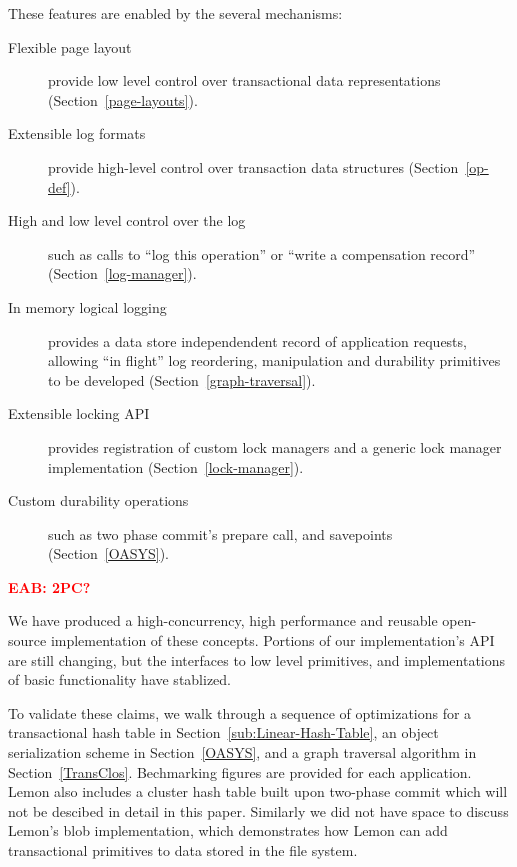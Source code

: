 \documentclass[letterpaper,twocolumn,english]{article}
\newcommand{\yad}{Lemon\xspace}
\newcommand{\eab}[1]{\textcolor{red}{\bf EAB: #1}}
\begin{document}
These features are enabled by the several mechanisms:
\begin{description}
\item[Flexible page layout] provide low level control over 
      transactional data representations (Section~\ref{page-layouts}).
\item[Extensible log formats] provide high-level control over
      transaction data structures (Section~\ref{op-def}).
\item [High and low level control over the log] such as calls to ``log this
      operation'' or ``write a compensation record'' (Section~\ref{log-manager}).
\item [In memory logical logging] provides a data store independendent
      record of application requests, allowing ``in flight'' log
      reordering, manipulation and durability primitives to be
      developed (Section~\ref{graph-traversal}).
\item[Extensible locking API] provides registration of custom lock managers
      and a generic lock manager implementation (Section~\ref{lock-manager}).
\item[Custom durability operations] such as two phase commit's
      prepare call, and savepoints (Section~\ref{OASYS}).
\item[\eab{2PC?}]
\end{description}

We have produced a high-concurrency, high performance and reusable
open-source implementation of these concepts.  Portions of our
implementation's API are still changing, but the interfaces to low
level primitives, and implementations of basic functionality have
stablized.  

To validate these claims, we walk
through a sequence of optimizations for a transactional hash
table in Section~\ref{sub:Linear-Hash-Table}, an object serialization 
scheme in Section~\ref{OASYS}, and a graph traversal algorithm in 
Section~\ref{TransClos}.  Bechmarking figures are provided for each 
application.  \yad also includes a cluster hash table 
built upon two-phase commit which will not be descibed in detail 
in this paper.  Similarly we did not have space to discuss \yad's 
blob implementation, which demonstrates how \yad can
add transactional primitives to data stored in the file system.

\end{document}
